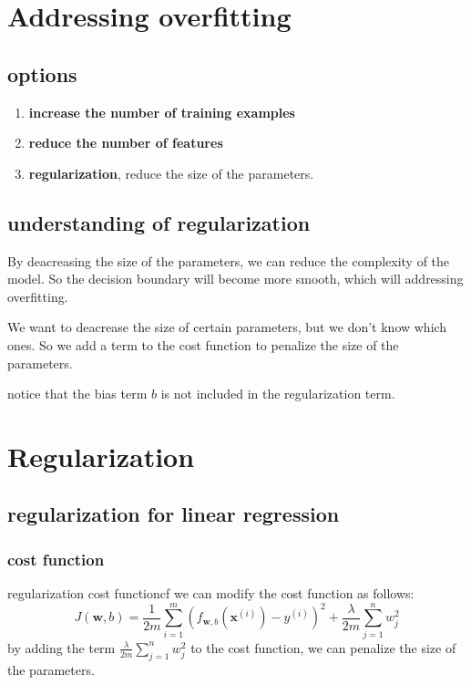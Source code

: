 \section{Addressing overfitting}
\subsection*{options}
\begin{enumerate}
    \item \textbf{increase the number of training examples}
    \item \textbf{reduce the number of features}
    \item \textbf{regularization}, reduce the size of the parameters.
\end{enumerate}

\subsection*{understanding of regularization}
\hspace{2em}By deacreasing the size of the parameters, 
we can reduce the complexity of the model. So the decision boundary will become more smooth,
which will addressing overfitting.\par
\hspace{2em}We want to deacrease the size of certain parameters,
 but we don't know which ones.
  So we add a term to the cost function to penalize the size of the parameters.\\

\begin{notebox}
    notice that the bias term $b$ is not included in the regularization term.
\end{notebox}

\section{Regularization}
\subsection*{regularization for linear regression}
\subsubsection*{cost function}
\begin{thmbox}{regularization cost function}{cf}
    we can modify the cost function as follows:
    \begin{equation}
        J(\mathbf{w}, b) = \frac{1}{2m}\sum_{i=1}^{m}\left(f_{\mathbf{w}, b}\left(\mathbf{x}^{(i)}\right) - y^{(i)}\right)^2 + \frac{\lambda}{2m}\sum_{j=1}^{n}w_j^2
    \end{equation}
    by adding the term $\frac{\lambda}{2m}\sum_{j=1}^{n}w_j^2$ to the cost function, we can penalize the size of the parameters.
\end{thmbox}
